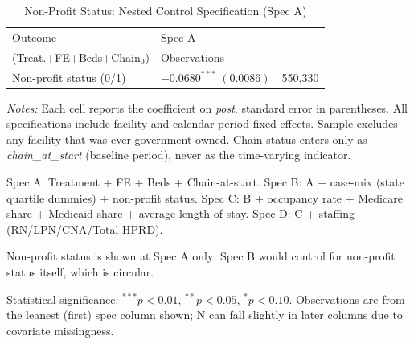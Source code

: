 \begin{table}[H]
\centering
\begin{threeparttable}
\caption{Non-Profit Status: Nested Control Specification (Spec A)}
\label{tab:nested-non-profit}
\small
\setlength{\tabcolsep}{6pt}
\begin{tabularx}{\textwidth}{@{} l Y r @{}}
\toprule
Outcome & Spec A\\(Treat.+FE+Beds+Chain$_{0}$) & Observations \\
\midrule
Non-profit status (0/1) &  & 550,330 \\
\bottomrule
\end{tabularx}

\begin{tablenotes}[flushleft]
\footnotesize
\item \textit{Notes:} Each cell reports the coefficient on \textit{post}, standard error in parentheses. All specifications include facility and calendar-period fixed effects. Sample excludes any facility that was ever government-owned. Chain status enters only as \textit{chain\_at\_start} (baseline period), never as the time-varying indicator.
\item Spec A: Treatment + FE + Beds + Chain-at-start. Spec B: A + case-mix (state quartile dummies) + non-profit status. Spec C: B + occupancy rate + Medicare share + Medicaid share + average length of stay. Spec D: C + staffing (RN/LPN/CNA/Total HPRD).
\item Non-profit status is shown at Spec A only: Spec B would control for non-profit status itself, which is circular.
\item Statistical significance: $^{***}p<0.01$, $^{**}p<0.05$, $^{*}p<0.10$. Observations are from the leanest (first) spec column shown; N can fall slightly in later columns due to covariate missingness.
\end{tablenotes}
\end{threeparttable}
\end{table}

